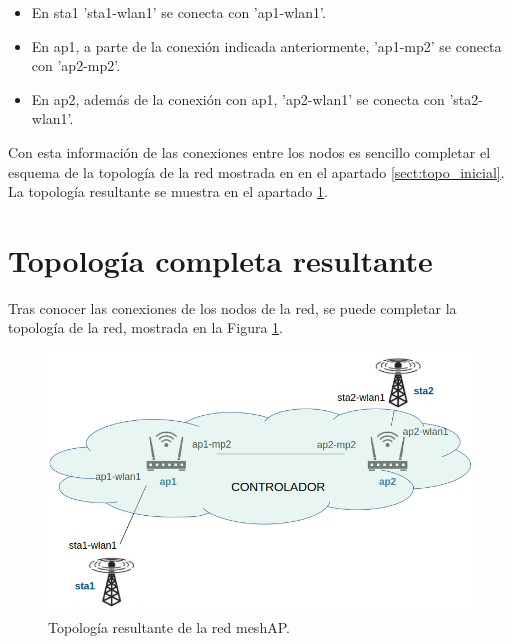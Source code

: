 \documentclass[a4paper,12pt,twoside,spanish]{book}
\begin{document}
\begin{itemize}
	\item En sta1 'sta1-wlan1' se conecta con 'ap1-wlan1'.
	\item En ap1, a parte de la conexión indicada anteriormente, 'ap1-mp2' se conecta con 'ap2-mp2'.
	\item En ap2, además de la conexión con ap1, 'ap2-wlan1' se conecta con 'sta2-wlan1'.
\end{itemize}

Con esta información de las conexiones entre los nodos es sencillo completar el esquema de la topología de la red mostrada en en el apartado \ref{sect:topo_inicial}. La topología resultante se muestra en el apartado \ref{sect:topo_completa}.\par 







\section{Topología completa resultante}\label{sect:topo_completa}

Tras conocer las conexiones de los nodos de la red, se puede completar la topología de la red, mostrada en la Figura \ref{fig:topo_completa}.\par

	\begin{figure}[!h]
		\centering
		\includegraphics[scale=.4]{Figuras/topo_completa.png}
		\caption{Topología resultante de la red meshAP.}
		\label{fig:topo_completa}
	\end{figure}
\end{document}
